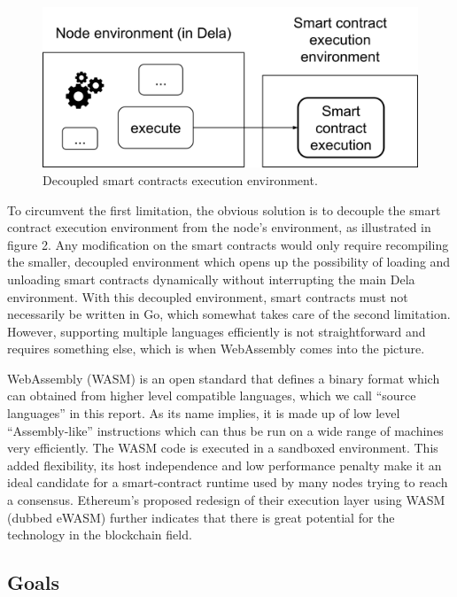 \documentclass[11pt, a4paper, twoside, openright]{article}
\begin{document}
\begin{figure}[htbp]
 \centering
  \includegraphics[width=12cm]{wasm2.png}
  \caption{Decoupled smart contracts execution environment.}
\end{figure}

To circumvent the first limitation, the obvious solution is to decouple the smart contract execution environment from the node's environment, as illustrated in figure 2. Any modification on the smart contracts would only require recompiling the smaller, decoupled environment which opens up the possibility of loading and unloading smart contracts dynamically without interrupting the main Dela environment. With this decoupled environment, smart contracts must not necessarily be written in Go, which somewhat takes care of the second limitation. However, supporting multiple languages efficiently is not straightforward and requires something else, which is when WebAssembly comes into the picture.

WebAssembly (WASM) is an open standard that defines a binary format which can obtained from higher level compatible languages, which we call ``source languages'' in this report. As its name implies, it is made up of low level ``Assembly-like'' instructions which can thus be run on a wide range of machines very efficiently. The WASM code is executed in a sandboxed environment. This added flexibility, its host independence and low performance penalty make it an ideal candidate for a smart-contract runtime used by many nodes trying to reach a consensus. Ethereum's proposed redesign of their execution layer using WASM (dubbed eWASM) \cite{ewasm} further indicates that there is great potential for the technology in the blockchain field. 

\subsection{Goals}
\label{Goals}
\end{document}
